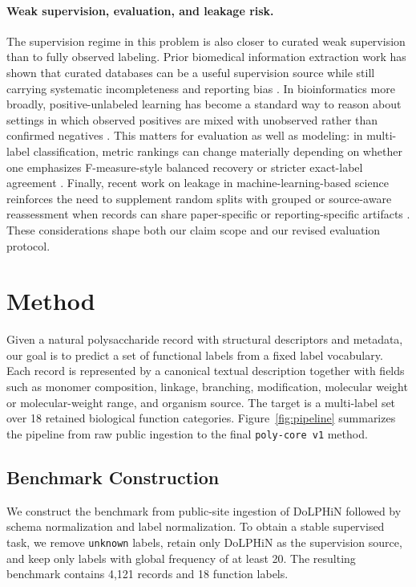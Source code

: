 \documentclass{article}
\begin{document}
\paragraph{Weak supervision, evaluation, and leakage risk.}
The supervision regime in this problem is also closer to curated weak supervision than to fully observed labeling. Prior biomedical information extraction work has shown that curated databases can be a useful supervision source while still carrying systematic incompleteness and reporting bias \cite{jain2016weaklysupervised}. In bioinformatics more broadly, positive-unlabeled learning has become a standard way to reason about settings in which observed positives are mixed with unobserved rather than confirmed negatives \cite{li2022pu}. This matters for evaluation as well as modeling: in multi-label classification, metric rankings can change materially depending on whether one emphasizes F-measure-style balanced recovery or stricter exact-label agreement \cite{pillai2017fmeasure}. Finally, recent work on leakage in machine-learning-based science reinforces the need to supplement random splits with grouped or source-aware reassessment when records can share paper-specific or reporting-specific artifacts \cite{kapoor2023leakage}. These considerations shape both our claim scope and our revised evaluation protocol.

\section{Method}
\label{sec:method}

Given a natural polysaccharide record with structural descriptors and metadata, our goal is to predict a set of functional labels from a fixed label vocabulary. Each record is represented by a canonical textual description together with fields such as monomer composition, linkage, branching, modification, molecular weight or molecular-weight range, and organism source. The target is a multi-label set over 18 retained biological function categories. Figure~\ref{fig:pipeline} summarizes the pipeline from raw public ingestion to the final \texttt{poly-core v1} method.

\subsection{Benchmark Construction}
\label{sec:benchmark}

We construct the benchmark from public-site ingestion of DoLPHiN followed by schema normalization and label normalization. To obtain a stable supervised task, we remove \texttt{unknown} labels, retain only DoLPHiN as the supervision source, and keep only labels with global frequency of at least 20. The resulting benchmark contains 4,121 records and 18 function labels.
\end{document}
